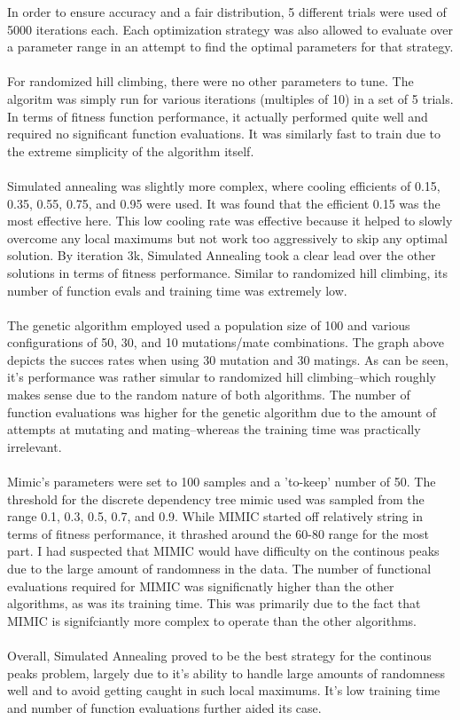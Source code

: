 \documentclass[h]{article}
\begin{document}
In order to ensure accuracy and a fair distribution, 5 different trials were 
used of 5000 iterations each.  Each optimization strategy was also allowed to evaluate over 
a parameter range in an attempt to find the optimal parameters for that 
strategy.
\\ \\
For randomized hill climbing, there were no other parameters to tune.  The 
algoritm was simply run for various iterations (multiples of 10) in a set of 5 
trials.  In terms of fitness function performance, it actually performed quite 
well and required no significant function evaluations. It was similarly fast to train due to the extreme simplicity 
of the algorithm itself. 
\\ \\
Simulated annealing was slightly more complex, where cooling efficients of 0.15, 
0.35, 0.55, 0.75, and 0.95 were used.  It was found that the efficient 0.15 was 
the most effective here.  This low cooling rate was effective because it helped to slowly overcome any local
 maximums but not work too aggressively to skip any optimal solution.  By 
 iteration 3k, Simulated Annealing took a clear lead over the other solutions in 
 terms of fitness performance.  Similar to randomized hill climbing, its number 
 of function evals and training time was extremely low.
\\ \\
The genetic algorithm employed used a population size of 100 and various 
configurations of 50, 30, and 10 mutations/mate combinations.  The graph above 
depicts the succes rates when using 30 mutation and 30 matings.  As can be seen, 
it's performance was rather simular to randomized hill climbing--which roughly 
makes sense due to the random nature of both algorithms.  The number of function 
evaluations was higher for the genetic algorithm due to the amount of attempts 
at mutating and mating--whereas the training time was practically irrelevant.
\\ \\
Mimic's parameters were set to 100 samples and a 'to-keep' number of 50.  
The threshold for the discrete dependency tree mimic used was sampled from the 
range 0.1, 0.3, 0.5, 0.7, and 0.9.  While MIMIC started off relatively string in 
terms of fitness performance, it thrashed around the 60-80 range for the most 
part.  I had suspected that MIMIC would have difficulty on the continous peaks 
due to the large amount of randomness in the data.  The number of functional 
evaluations required for MIMIC was significnatly higher than the other 
algorithms, as was its training time.  This was primarily due to the fact that 
MIMIC is signifciantly more complex to operate than the other algorithms.
\\ \\
Overall, Simulated Annealing proved to be the best strategy for the continous 
peaks problem, largely due to it's ability to handle large amounts of randomness 
well and to avoid getting caught in such local maximums.  It's low training time 
and number of function evaluations further aided its case.
\end{document}
